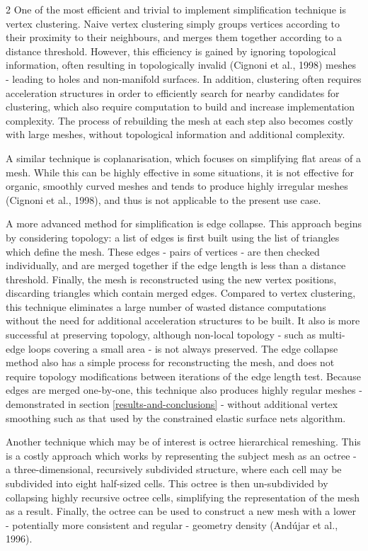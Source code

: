 \documentclass[]{article}
\begin{document}
\begin{multicols}{2}
One of the most efficient and trivial to implement simplification technique is vertex clustering. Naive vertex clustering simply groups vertices according to their proximity to their neighbours, and merges them together according to a distance threshold. However, this efficiency is gained by ignoring topological information, often resulting in topologically invalid (Cignoni et al., 1998) meshes - leading to holes and non-manifold surfaces. In addition, clustering often requires acceleration structures in order to efficiently search for nearby candidates for clustering, which also require computation to build and increase implementation complexity. The process of rebuilding the mesh at each step also becomes costly with large meshes, without topological information and additional complexity.

A similar technique is coplanarisation, which focuses on simplifying flat areas of a mesh. While this can be highly effective in some situations, it is not effective for organic, smoothly curved meshes and tends to produce highly irregular meshes (Cignoni et al., 1998), and thus is not applicable to the present use case.

A more advanced method for simplification is edge collapse. This approach begins by considering topology: a list of edges is first built using the list of triangles which define the mesh. These edges - pairs of vertices - are then checked individually, and are merged together if the edge length is less than a distance threshold. Finally, the mesh is reconstructed using the new vertex positions, discarding triangles which contain merged edges. Compared to vertex clustering, this technique eliminates a large number of wasted distance computations without the need for additional acceleration structures to be built. It also is more successful at preserving topology, although non-local topology - such as multi-edge loops covering a small area - is not always preserved. The edge collapse method also has a simple process for reconstructing the mesh, and does not require topology modifications between iterations of the edge length test. Because edges are merged one-by-one, this technique also produces highly regular meshes - demonstrated in section \ref{results-and-conclusions} - without additional vertex smoothing such as that used by the constrained elastic surface nets algorithm.

Another technique which may be of interest is octree hierarchical remeshing. This is a costly approach which works by representing the subject mesh as an octree - a three-dimensional, recursively subdivided structure, where each cell may be subdivided into eight half-sized cells. This octree is then un-subdivided by collapsing highly recursive octree cells, simplifying the representation of the mesh as a result. Finally, the octree can be used to construct a new mesh with a lower - potentially more consistent and regular - geometry density (Andújar et al., 1996).


\end{multicols}
\end{document}
